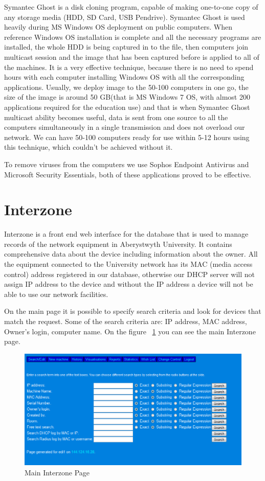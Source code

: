 \documentclass[10pt,a4paper,headinclude=true,twoside]{report}
\begin{document}
Symantec Ghost is a disk cloning program, capable of making one-to-one copy of any storage media (HDD, SD Card, USB Pendrive). Symantec Ghost is used heavily during MS Windows OS deployment on public computers. When reference Windows OS installation is complete and all the necessary programs are installed, the whole HDD is being captured in to the file, then computers join multicast session and the image that has been captured before is applied to all of the machines. It is a very effective technique, because there is no need to spend hours with each computer installing Windows OS with all the corresponding applications. Usually, we deploy image to the 50-100 computers in one go, the size of the image is around 50 GB(that is MS Windows 7 OS, with almost 200 applications required for the education use) and that is when Symantec Ghost multicast ability becomes useful, data is sent from one source to all the computers simultaneously in a single transmission and does not overload our network. We can have 50-100 computers ready for use within 5-12 hours using this technique, which couldn't be achieved without it.

To remove viruses from the computers we use Sophos Endpoint Antivirus and Microsoft Security Essentials, both of these applications proved to be effective.
 
\section{Interzone}
Interzone is a front end web interface for the database that is used to manage records of the network equipment in Aberystwyth University. It contains comprehensive data about the device including information about the owner. All the equipment connected to the University network has its MAC (media access control) address registered in our database, otherwise our DHCP server will not assign IP address to the device and without the IP address a device will not be able to use our network facilities.

On the main page it is possible to specify search criteria and look for devices that match the request. Some of the search criteria are: IP address, MAC address, Owner's login, computer name. On the figure ~\ref{fig:main_interzone_page} you can see the main Interzone page.

\begin{figure}[H]
\centering
\centerline{\includegraphics[scale=0.5]{./main_interzone_page}}
\caption{Main Interzone Page}
\label{fig:main_interzone_page}
\end{figure}
\end{document}
